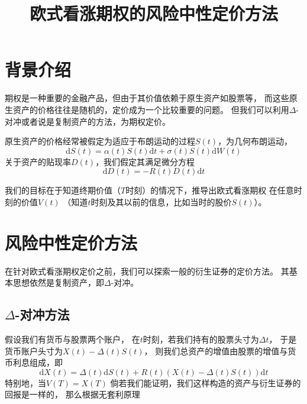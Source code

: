 \documentclass[12pt]{ctexart}
\title{欧式看涨期权的风险中性定价方法}
\date{}
\def\diff{\mathrm{d}}
\begin{document}
    \maketitle

    \section{背景介绍}
    期权是一种重要的金融产品，但由于其价值依赖于原生资产如股票等，
    而这些原生资产的价格往往是随机的，定价成为一个比较重要的问题。
    但我们可以利用$\Delta$-对冲或者说是复制资产的方法，为期权定价。

    原生资产的价格经常被假定为适应于布朗运动的过程$S(t)$，为几何布朗运动，
    \begin{equation}
        \label{eq:stock price}
        \diff S(t)=\alpha(t)S(t)\diff t+\sigma(t)S(t)\diff W(t)
    \end{equation}
    关于资产的贴现率$D(t)$，我们假定其满足微分方程
    \begin{equation}
        \label{eq:discount}
        \diff D(t)=-R(t)D(t)\diff t
    \end{equation}
    
    我们的目标在于知道终期价值（$T$时刻）的情况下，推导出欧式看涨期权
    在任意时刻的价值$V(t)$
    （知道$t$时刻及其以前的信息，比如当时的股价$S(t)$）。

    \section{风险中性定价方法}
    在针对欧式看涨期权定价之前，我们可以探索一般的衍生证券的定价方法。
    其基本思想依然是复制资产，即$\Delta$-对冲。

    \subsection[Delta-对冲方法]{$\Delta$-对冲方法}
    假设我们有货币与股票两个账户，
    在$t$时刻，若我们持有的股票头寸为$\Delta t$，
    于是货币账户头寸为$X(t)-\Delta(t)S(t)$，
    则我们总资产的增值由股票的增值与货币利息组成，即
    \begin{equation}
        \label{eq:asset value}        
        \diff X(t)=\Delta(t)\diff S(t)+R(t)(X(t)-\Delta(t)S(t))\diff t
    \end{equation}
    特别地，当$V(T)=X(T)$
    倘若我们能证明，我们这样构造的资产与衍生证券的回报是一样的，
    那么根据无套利原理
\end{document}
